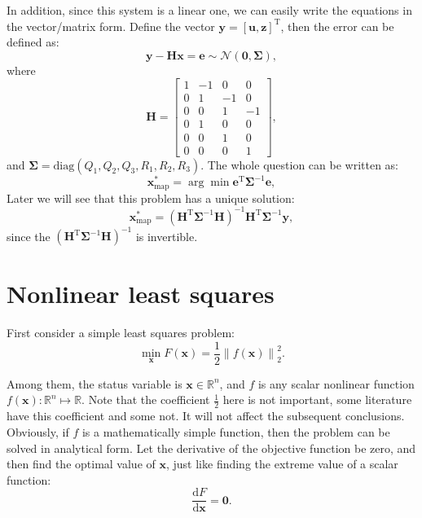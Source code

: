 In addition, since this system is a linear one, we can easily write the equations in the vector/matrix form. Define the vector $\bm{y}=[\bm{u}, \bm{z}]^\mathrm{T}$, then the error can be defined as:
\begin{equation}
    \bm{y}-\bm{H}\bm{x} = \bm{e} \sim \mathcal{N}(\bm{0}, \boldsymbol{\Sigma}),
\end{equation}
where
\begin{equation}
    \bm{H} = \left[ {\begin{array}{*{20}{c}}
            1&{-1}&0&0\\
            0&1&{-1}&0\\
            0&0&1&{-1}\\
            \hline
            0&1&0&0\\
            0&0&1&0\\
            0&0&0&1
    \end{array}} \right],
\end{equation}
and $\boldsymbol{\Sigma}=\mathrm{diag}(Q_1, Q_2, Q_3, R_1, R_2, R_3)$. The whole question can be written as:
\begin{equation}
    \bm{x}^*_{\mathrm{map}} = \arg \min \bm{e}^\mathrm{T} \boldsymbol{\Sigma}^{-1} \bm{e},
\end{equation}
Later we will see that this problem has a unique solution:
\begin{equation}
    \bm{x}^*_{\mathrm{map}} = (\bm{H}^\mathrm{T} \boldsymbol{\Sigma}^{-1} \bm{H})^{-1} \bm{H}^\mathrm{T} \boldsymbol{\Sigma}^{-1} \bm{y},
\end{equation}
since the $(\bm{H}^\mathrm{T} \boldsymbol{\Sigma}^{-1} \bm{H})^{-1}$ is invertible.

\section{Nonlinear least squares}
\label{sec:6.2}
First consider a simple least squares problem:
\begin{equation}
    \mathop {\min }\limits_{\bm{x}} F(\bm{x}) = \frac{1}{2}{\left\| {f\left( \bm{x} \right) } \right\|^2_2}.
\end{equation}

Among them, the status variable is $\bm{x} \in \mathbb{R}^n$, and $f$ is any scalar nonlinear function $f(\bm{x}): \mathbb{R}^n \mapsto \mathbb{R}$. Note that the coefficient $\frac{1}{2}$ here is not important, some literature have this coefficient and some not. It will not affect the subsequent conclusions. Obviously, if $f$ is a mathematically simple function, then the problem can be solved in analytical form. Let the derivative of the objective function be zero, and then find the optimal value of $\bm{x}$, just like finding the extreme value of a scalar function:
\begin{equation}
    \frac{ \mathrm{d} F}{ \mathrm{d} \bm{x}} = \bm{0}.
\end{equation}

